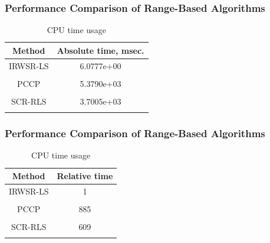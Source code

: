 \documentclass [t] {beamer} %
\begin{document}
\begin{frame} %
\frametitle{Performance Comparison of Range-Based Algorithms}
\begin{table}
\phantom{m}
\caption{CPU time usage}
\begin{tabular}{||c|c||} 
\hhline{|t:==:t|}
Method &  Absolute time, msec.\\ \hline
IRWSR-LS  & 6.0777e+00 \\&\\
PCCP & 5.3790e+03 \\&\\
SCR-RLS & 3.7005e+03   \\ %
\hhline{|b:==:b|} 
\end{tabular}
\end{table}
\end{frame}

\begin{frame} %
\frametitle{Performance Comparison of Range-Based Algorithms}
\begin{table}
\phantom{m}
\caption{CPU time usage}
\begin{tabular}{||c|c||} 
\hhline{|t:==:t|}
Method &  Relative time\\ \hline
IRWSR-LS  & 1 \\&\\
PCCP & 885 \\&\\
SCR-RLS &  609  \\ %
\hhline{|b:==:b|} 
\end{tabular}
\end{table}
\end{frame}
\end{document}
